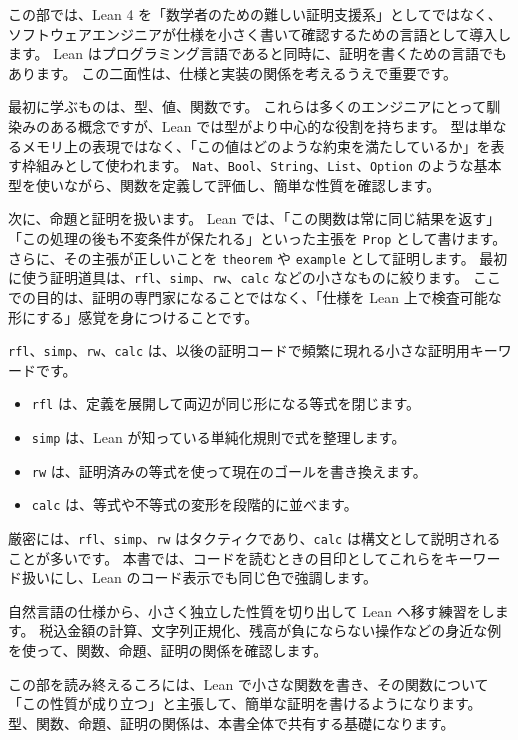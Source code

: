 この部では、Lean 4 を「数学者のための難しい証明支援系」としてではなく、ソフトウェアエンジニアが仕様を小さく書いて確認するための言語として導入します。
Lean はプログラミング言語であると同時に、証明を書くための言語でもあります。
この二面性は、仕様と実装の関係を考えるうえで重要です。

最初に学ぶものは、型、値、関数です。
これらは多くのエンジニアにとって馴染みのある概念ですが、Lean では型がより中心的な役割を持ちます。
型は単なるメモリ上の表現ではなく、「この値はどのような約束を満たしているか」を表す枠組みとして使われます。
\texttt{Nat}、\texttt{Bool}、\texttt{String}、\texttt{List}、\texttt{Option} のような基本型を使いながら、関数を定義して評価し、簡単な性質を確認します。

次に、命題と証明を扱います。
Lean では、「この関数は常に同じ結果を返す」「この処理の後も不変条件が保たれる」といった主張を \texttt{Prop} として書けます。
さらに、その主張が正しいことを \texttt{theorem} や \texttt{example} として証明します。
最初に使う証明道具は、\texttt{rfl}、\texttt{simp}、\texttt{rw}、\texttt{calc} などの小さなものに絞ります。
ここでの目的は、証明の専門家になることではなく、「仕様を Lean 上で検査可能な形にする」感覚を身につけることです。

\texttt{rfl}、\texttt{simp}、\texttt{rw}、\texttt{calc} は、以後の証明コードで頻繁に現れる小さな証明用キーワードです。
\begin{itemize}
\item \texttt{rfl} は、定義を展開して両辺が同じ形になる等式を閉じます。
\item \texttt{simp} は、Lean が知っている単純化規則で式を整理します。
\item \texttt{rw} は、証明済みの等式を使って現在のゴールを書き換えます。
\item \texttt{calc} は、等式や不等式の変形を段階的に並べます。
\end{itemize}
厳密には、\texttt{rfl}、\texttt{simp}、\texttt{rw} はタクティクであり、\texttt{calc} は構文として説明されることが多いです。
本書では、コードを読むときの目印としてこれらをキーワード扱いにし、Lean のコード表示でも同じ色で強調します。

自然言語の仕様から、小さく独立した性質を切り出して Lean へ移す練習をします。
税込金額の計算、文字列正規化、残高が負にならない操作などの身近な例を使って、関数、命題、証明の関係を確認します。

この部を読み終えるころには、Lean で小さな関数を書き、その関数について「この性質が成り立つ」と主張して、簡単な証明を書けるようになります。
型、関数、命題、証明の関係は、本書全体で共有する基礎になります。

